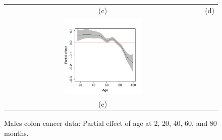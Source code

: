 \documentclass[12pt]{article}
\begin{document}
\begin{figure}
\begin{tabular}{cc}
   (c) & (d) \\
   \includegraphics[width=0.4\textwidth]{peff40_males.pdf} & \\
   (e) 
\end{tabular}
\caption{ Males colon cancer data: Partial effect of age at 2, 20, 40, 60, and 80 months.}
\label{fig:peff_age_males}
\end{figure}
\end{document}
